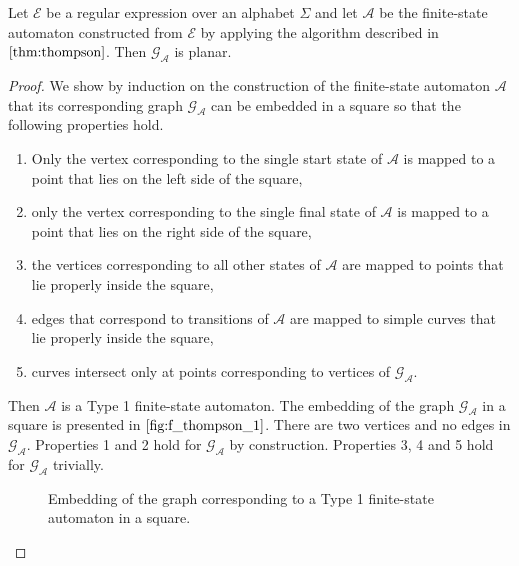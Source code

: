 \begin{proposition}
  Let $\mathcal{E}$ be a regular expression over an alphabet $\Sigma$ and let
  $\mathcal{A}$ be the finite-state automaton constructed from $\mathcal{E}$ by
  applying the algorithm described in $\Cref{thm:thompson}$. Then
  $\mathcal{G}_\mathcal{A}$ is planar.
\end{proposition}

\begin{proof}
  We show by induction on the construction of the finite-state automaton
  $\mathcal{A}$ that its corresponding graph $\mathcal{G}_{\mathcal{A}}$ can be
  embedded in a square so that the following properties hold.
  \begin{enumerate}
    \item Only the vertex corresponding to the single start state of $\mathcal{A}$ is
          mapped to a point that lies on the left side of the square,
    \item only the vertex corresponding to the single final state of $\mathcal{A}$ is
          mapped to a point that lies on the right side of the square,
    \item the vertices corresponding to all other states of $\mathcal{A}$ are mapped
          to points that lie properly inside the square,
    \item edges that correspond to transitions of $\mathcal{A}$ are mapped to simple
          curves that lie properly inside the square,
    \item curves intersect only at points corresponding to vertices of
          $\mathcal{G}_{\mathcal{A}}$.
  \end{enumerate}

  \begin{case}[$\mathcal{E} = \emptyset$]
    Then $\mathcal{A}$ is a Type 1 finite-state automaton. The embedding of the
    graph $\mathcal{G}_{\mathcal{A}}$ in a square is presented in
    $\Cref{fig:f_thompson_1}$. There are two vertices and no edges in
    $\mathcal{G}_{\mathcal{A}}$. Properties 1 and 2 hold for
    $\mathcal{G}_{\mathcal{A}}$ by construction. Properties 3, 4 and 5 hold for
    $\mathcal{G}_{\mathcal{A}}$ trivially.

    \begin{figure}[!h]
      \centering
      \caption{Embedding of the graph corresponding to a Type 1 finite-state
      automaton in a square.}
      \label{fig:f_thompson_1}
    \end{figure}
  \end{case}


\end{proof}
